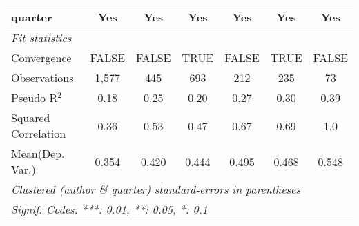 \begin{tabular}{lcccccc}
   quarter                                                    & Yes          & Yes           & Yes          & Yes           & Yes          & Yes\\  
   \midrule
   \emph{Fit statistics}\\
   Convergence                                                &FALSE         & FALSE         & TRUE         & FALSE         & TRUE         & FALSE\\  
   Observations                                               & 1,577        & 445           & 693          & 212           & 235          & 73\\  
   Pseudo R$^2$                                               & 0.18         & 0.25          & 0.20         & 0.27          & 0.30         & 0.39\\  
   Squared Correlation                                        & 0.36         & 0.53          & 0.47         & 0.67          & 0.69         & 1.0\\  
Mean(Dep. Var.) & 0.354 & 0.420 & 0.444 & 0.495 & 0.468 & 0.548 \\
   \midrule \midrule
   \multicolumn{7}{l}{\emph{Clustered (author \& quarter) standard-errors in parentheses}}\\
   \multicolumn{7}{l}{\emph{Signif. Codes: ***: 0.01, **: 0.05, *: 0.1}}\\
\end{tabular}
\par\endgroup

